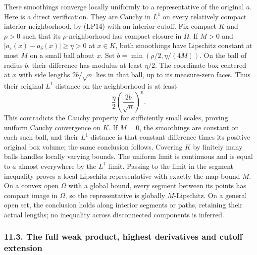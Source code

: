 \documentclass[
  11pt,
]{article}
\makeatletter
\let\ReaderOriginalAnchorStart\hyper@anchorstart
\let\ReaderOriginalAnchorEnd\hyper@anchorend
\let\ReaderPendingAliases\@empty
\def\ReaderArmAliases#1{\gdef\ReaderPendingAliases{#1}}
\def\hyper@anchorstart#1{\ReaderIfNativeAnchorTF{#1}{\ReaderPendingAliases\global\let\ReaderPendingAliases\@empty}{}\ReaderOriginalAnchorStart{#1}}
\makeatother
\begin{document}
These smoothings converge locally uniformly to a representative of the
original \(a\). Here is a direct verification. They are Cauchy in
\(L^1\) on every relatively compact interior neighborhood, by (LP14)
with an interior cutoff. Fix compact \(K\) and \(\rho>0\) such that its
\(\rho\)-neighborhood has compact closure in \(\Omega\). If \(M>0\) and
\(|a_\varepsilon(x)-a_\delta(x)|\geq\eta>0\) at \(x\in K\), both
smoothings have Lipschitz constant at most \(M\) on a small ball about
\(x\). Set \(b=\min(\rho/2,\eta/(4M))\). On the ball of radius \(b\),
their difference has modulus at least \(\eta/2\). The coordinate box
centered at \(x\) with side lengths \(2b/\sqrt n\) lies in that ball, up
to its measure-zero faces. Thus their original \(L^1\) distance on the
neighborhood is at least \[
          \frac{\eta}{2}\left(\frac{2b}{\sqrt n}\right)^n .
                                                               \tag{LC7}
\] This contradicts the Cauchy property for sufficiently small scales,
proving uniform Cauchy convergence on \(K\). If \(M=0\), the smoothings
are constant on each such ball, and their \(L^1\) distance is that
constant difference times its positive original box volume; the same
conclusion follows. Covering \(K\) by finitely many balls handles
locally varying bounds. The uniform limit is continuous and is equal to
\(a\) almost everywhere by the \(L^1\) limit. Passing to the limit in
the segment inequality proves a local Lipschitz representative with
exactly the map bound \(M\). On a convex open \(\Omega\) with a global
bound, every segment between its points has compact image in \(\Omega\),
so the representative is globally \(M\)-Lipschitz. On a general open
set, the conclusion holds along interior segments or paths, retaining
their actual lengths; no inequality across disconnected components is
inferred.

\ReaderArmAliases{\ReaderOriginalAnchorStart{AN03-LCE-LIP-003}\ReaderOriginalAnchorEnd\begingroup\expandafter\def\csname @currentHref\endcsname{AN03-LCE-LIP-003}\label{AN03-LCE-LIP-003}\endgroup\ReaderOriginalAnchorStart{the-full-weak-product-highest-derivatives-and-cutoff-extension}\ReaderOriginalAnchorEnd}
\subsubsection{11.3. The full weak product, highest derivatives and
cutoff
extension}\label{the-full-weak-product-highest-derivatives-and-cutoff-extension}
\end{document}
